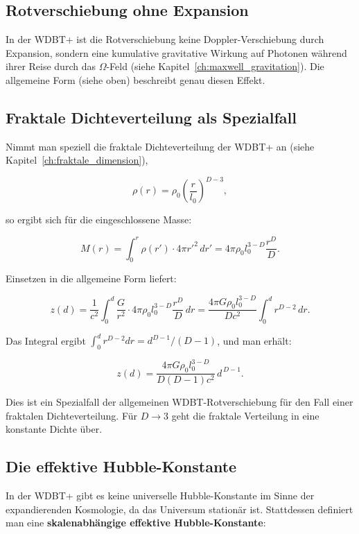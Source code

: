 \subsection{Rotverschiebung ohne Expansion}
\label{sub:kosmo_rot_ohne_expansion}

In der WDBT+ ist die Rotverschiebung keine Doppler-Verschiebung durch Expansion, sondern eine kumulative gravitative Wirkung auf Photonen während ihrer Reise durch das \( \Omega \)-Feld (siehe Kapitel~\ref{ch:maxwell_gravitation}). Die allgemeine Form (siehe oben) beschreibt genau diesen Effekt.

\subsection{Fraktale Dichteverteilung als Spezialfall}
\label{sub:kosmo_rot_fraktal}

Nimmt man speziell die fraktale Dichteverteilung der WDBT+ an (siehe Kapitel~\ref{ch:fraktale_dimension}),

\[
\rho(r) = \rho_0 \left( \frac{r}{l_0} \right)^{D-3},
\]

so ergibt sich für die eingeschlossene Masse:

\[
M(r) = \int_0^r \rho(r') \cdot 4\pi r'^2 \, dr' = 4\pi \rho_0 l_0^{3-D} \frac{r^D}{D}.
\]

Einsetzen in die allgemeine Form liefert:

\[
z(d) = \frac{1}{c^2} \int_0^d \frac{G}{r^2} \cdot 4\pi \rho_0 l_0^{3-D} \frac{r^D}{D} \, dr
     = \frac{4\pi G \rho_0 l_0^{3-D}}{D c^2} \int_0^d r^{D-2} \, dr.
\]

Das Integral ergibt \( \int_0^d r^{D-2} dr = d^{D-1} / (D-1) \), und man erhält:

\[
z(d) = \frac{4\pi G \rho_0 l_0^{3-D}}{D(D-1) c^2} \, d^{\,D-1}.
\]

Dies ist ein Spezialfall der allgemeinen WDBT-Rotverschiebung für den Fall einer fraktalen Dichteverteilung. Für \( D \to 3 \) geht die fraktale Verteilung in eine konstante Dichte über.

\subsection{Die effektive Hubble-Konstante}
\label{sub:kosmo_effektive_hubble}

In der WDBT+ gibt es keine universelle Hubble-Konstante im Sinne der expandierenden Kosmologie, da das Universum stationär ist. Stattdessen definiert man eine \textbf{skalenabhängige effektive Hubble-Konstante}:

